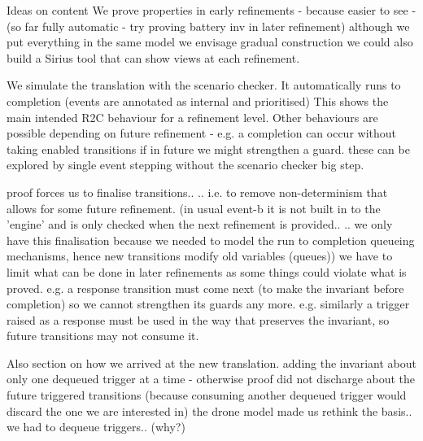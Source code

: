 {\color{red}
Ideas on content
We prove properties in early refinements - because easier to see - (so far fully automatic - try proving battery inv in later refinement)
	although we put everything in the same model we envisage gradual construction	
	we could also build a Sirius tool that can show views at each refinement.

We simulate the translation with the scenario checker. It automatically runs to completion (events are annotated as internal and prioritised)
This shows the main intended R2C behaviour for a refinement level.
Other behaviours are possible depending on future refinement - e.g. a completion can occur without taking enabled transitions if in future we might strengthen a guard.
	these can be explored by single event stepping without the scenario checker big step.

proof forces us to finalise transitions..
	.. i.e. to remove non-determinism that allows for some future refinement.
		(in usual event-b it is not built in to the 'engine' and is only checked when the next refinement is provided..
		.. we only have this finalisation because we needed to model the run to completion queueing mechanisms, hence new transitions modify old variables (queues))
	we have to limit what can be done in later refinements as some things could violate what is proved.
	e.g. a response transition must come next (to make the invariant before completion) so we cannot strengthen its guards any more.
	e.g. similarly a trigger raised as a response must be used in the way that preserves the invariant, so future transitions may not consume it.

Also section on how we arrived at the new translation.
	adding the invariant about only one dequeued trigger at a time - otherwise proof did not discharge about the future triggered transitions
		(because consuming another dequeued trigger would discard the one we are interested in)
	the drone model made us rethink the basis.. we had to dequeue triggers.. (why?)
}
